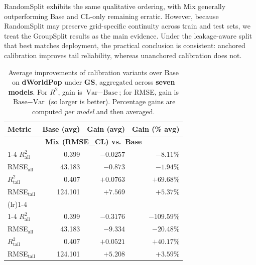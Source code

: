 \documentclass[preprint,12pt]{elsarticle}
\renewcommand{\arraystretch}{1.1}
\begin{document}
RandomSplit exhibits the same qualitative ordering, with Mix generally outperforming Base and CL-only remaining erratic. However, because RandomSplit may preserve grid-specific continuity across train and test sets, we treat the GroupSplit results as the main evidence. Under the leakage-aware split that best matches deployment, the practical conclusion is consistent: anchored calibration improves tail reliability, whereas unanchored calibration does not.


\begin{table}[htbp]
\centering
\small
\setlength{\tabcolsep}{5pt}
\renewcommand{\arraystretch}{1.10}
\caption{Average improvements of calibration variants over Base on \textbf{dWorldPop} under \textbf{GS}, aggregated across \textbf{seven models}. For $R^2$, gain is $\text{Var}-\text{Base}$; for RMSE, gain is $\text{Base}-\text{Var}$ (so larger is better). Percentage gains are computed \emph{per model} and then averaged.}
\label{tab:dwp_gs_avg_gain}
\begin{tabular}{lrrr}
\toprule
\textbf{Metric} & \textbf{Base (avg)} & \textbf{Gain (avg)} & \textbf{Gain (\% avg)} \\
\midrule

\multicolumn{4}{c}{\textbf{Mix (RMSE\_CL) vs.\ Base}} \\
\cmidrule(lr){1-4}
$R^2_{\mathrm{all}}$    & 0.399   & $-0.0257$  & $-8.11\%$ \\
RMSE$_{\mathrm{all}}$   & 43.183  & $-0.873$   & $-1.94\%$ \\
$R^2_{\mathrm{tail}}$   & 0.407   & $\mathbf{+0.0763}$  & $\mathbf{+69.68\%}$ \\
RMSE$_{\mathrm{tail}}$  & 124.101 & $\mathbf{+7.569}$   & $\mathbf{+5.37\%}$ \\
\addlinespace
\cmidrule(lr){1-4}
\multicolumn{4}{c}{\textbf{CL-only vs.\ Base}} \\
\cmidrule(lr){1-4}
$R^2_{\mathrm{all}}$    & 0.399   & $-0.3176$  & $-109.59\%$ \\
RMSE$_{\mathrm{all}}$   & 43.183  & $-9.334$   & $-20.48\%$ \\
$R^2_{\mathrm{tail}}$   & 0.407   & $+0.0521$  & $+40.17\%$ \\
RMSE$_{\mathrm{tail}}$  & 124.101 & $+5.208$   & $+3.59\%$ \\

\bottomrule
\end{tabular}
\end{table}
\end{document}
